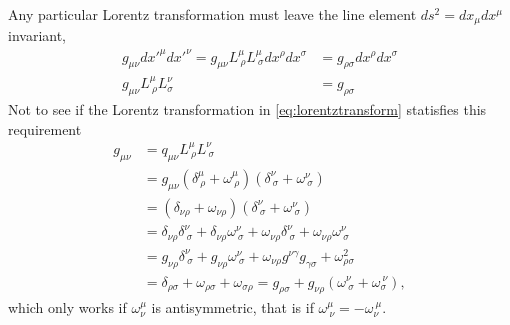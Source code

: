\documentclass[11pt]{amsart}
\begin{document}
Any particular Lorentz transformation must leave the line element $ds^2 = dx_{\mu}dx^{\mu}$ invariant,
\begin{align*}
g_{\mu\nu}dx'^{\mu}dx'^{\nu} = g_{\mu\nu} L^\mu_{\ \rho} L^\mu_{\ \sigma}dx^\rho dx^\sigma 
											&= g_{\rho\sigma}dx^\rho dx^\sigma \\
g_{\mu\nu}L^{\mu}_{\ \rho}L^{\nu}_{\sigma}	&= g_{\rho\sigma}
\end{align*}
Not to see if the Lorentz transformation in \ref{eq:lorentztransform} statisfies this requirement
\begin{align*}
g_{\mu\nu}  &= q_{\mu\nu}L^{\mu}_{\ \rho}L^{\nu}_{\ \sigma} \\
			&= g_{\mu\nu}(\delta^{\mu}_{\ \rho} + \omega^{\mu}_{\ \rho})(\delta^{\nu}_{\ \sigma} + \omega^{\nu}_{\ \sigma}) \\
			&= (\delta_{\nu\rho} + \omega_{\nu\rho})(\delta^{\nu}_{\ \sigma} + \omega^{\nu}_{\ \sigma}) \\
			&= \delta_{\nu\rho}\delta^{\nu}_{\ \sigma} + \delta_{\nu\rho}\omega^{\nu}_{\ \sigma} + \omega_{\nu\rho}\delta^{\nu}_{\ \sigma} + \omega_{\nu\rho}\omega^{\nu}_{\ \sigma} \\
			&= g_{\nu\rho}\delta^{\nu}_{\ \sigma} + g_{\nu\rho}\omega^{\nu}_{\ \sigma} + \omega_{\nu\rho}g^{\nu\gamma} g_{\gamma\sigma} + \omega^2_{\rho\sigma} \\
			& = \delta_{\rho\sigma} + \omega_{\rho\sigma} + \omega_{\sigma\rho} = g_{\rho\sigma} + g_{\nu\rho}(\omega^{\nu}_{\ \sigma} + \omega_{\sigma}^{\ \nu}),
\end{align*}
which only works if $\omega^{\mu}_{\nu}$ is antisymmetric, that is if $\omega^{\mu}_{\ \nu} = -\omega_{\nu}^{\ \mu}$.
\end{document}
